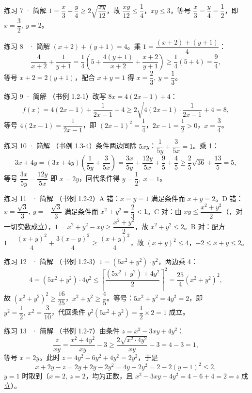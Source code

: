 \begin{solution}{练习 7 · 简解}
$1=\dfrac x3+\dfrac y4\ge 2\sqrt{\dfrac{xy}{12}}$，故 $\dfrac{xy}{12}\le\dfrac14$，$xy\le 3$，等号 $\dfrac x3=\dfrac y4=\dfrac12$，即 $x=\dfrac32,\ y=2$。
\end{solution}

\begin{solution}{练习 8 \starred\ · 简解}
$(x+2)+(y+1)=4$。乘 $1=\dfrac{(x+2)+(y+1)}{4}$：
\[
\frac{4}{x+2}+\frac{1}{y+1}=\frac14\left(5+\frac{4(y+1)}{x+2}+\frac{x+2}{y+1}\right)\ge\frac14(5+4)=\frac94,
\]
等号 $x+2=2(y+1)$，配合 $x+y=1$ 得 $x=\dfrac23,\ y=\dfrac13$。
\end{solution}

\begin{solution}{练习 9 · 简解}
（书例 1.2-1）改写 $8x=4(2x-1)+4$：
\[
f(x)=4(2x-1)+\frac{1}{2x-1}+4\ge 2\sqrt{4(2x-1)\cdot\frac1{2x-1}}+4=8,
\]
等号 $4(2x-1)=\dfrac1{2x-1}$，即 $(2x-1)^2=\dfrac14$，$2x-1=\dfrac12>0$，$x=\dfrac34$。
\end{solution}

\begin{solution}{练习 10 · 简解}
（书例 1.3-4）条件两边同除 $5xy$：$\dfrac{1}{5y}+\dfrac{3}{5x}=1$。乘 1：
\[
3x+4y=(3x+4y)\left(\frac{1}{5y}+\frac{3}{5x}\right)=\frac{3x}{5y}+\frac{12y}{5x}+\frac95+\frac45\ge\frac25\sqrt{36}+\frac{13}5=5,
\]
等号 $\dfrac{3x}{5y}=\dfrac{12y}{5x}$ 即 $x=2y$，回代条件得 $y=\dfrac12,\ x=1$。
\end{solution}

\begin{solution}{练习 11 \starred\ · 简解}
（书例 1.2-2）A 错：$x=y=1$ 满足条件而 $x+y=2$。D 错：$x=\dfrac{\sqrt3}3,\ y=-\dfrac{\sqrt3}3$ 满足条件而 $x^2+y^2=\dfrac23<1$。C 对：由 $xy\le\dfrac{x^2+y^2}2$（\starref{}，对一切实数成立），$1=x^2+y^2-xy\ge\dfrac{x^2+y^2}2$，故 $x^2+y^2\le 2$。B 对：配方 $1=\dfrac{(x+y)^2}4+\dfrac{3(x-y)^2}4\ge\dfrac{(x+y)^2}4$，故 $(x+y)^2\le 4$，$-2\le x+y\le 2$。
\end{solution}

\begin{solution}{练习 12 \starred\starred\ · 简解}
（书例 1.2-3）$1=(5x^2+y^2)\cdot y^2$，两边乘 4：
\[
4=(5x^2+y^2)\cdot 4y^2\le\left[\frac{(5x^2+y^2)+4y^2}{2}\right]^2=\frac{25}4(x^2+y^2)^2,
\]
故 $(x^2+y^2)^2\ge\dfrac{16}{25}$，$x^2+y^2\ge\dfrac45$。等号：$5x^2+y^2=4y^2=2$，即 $y^2=\dfrac12,\ x^2=\dfrac3{10}$，代回条件 $y^2(5x^2+y^2)=\dfrac12\times2=1$ 成立。
\end{solution}

\begin{solution}{练习 13 \starred\ · 简解}
（书例 1.2-7）由条件 $z=x^2-3xy+4y^2$：
\[
\frac z{xy}=\frac{x^2+4y^2}{xy}-3\ge\frac{2\sqrt{x^2\cdot4y^2}}{xy}-3=4-3=1,
\]
等号 $x=2y$。此时 $z=4y^2-6y^2+4y^2=2y^2$，于是
\[
x+2y-z=2y+2y-2y^2=4y-2y^2=2-2(y-1)^2\le 2,
\]
$y=1$ 时取到（$x=2,\ z=2$，均为正数，且 $x^2-3xy+4y^2=4-6+4=2=z$ 成立）。
\end{solution}

\clearpage
